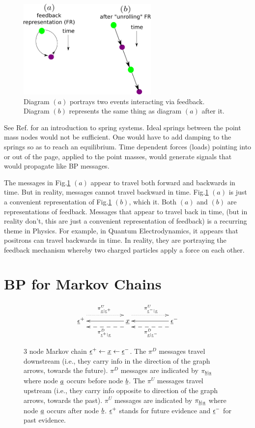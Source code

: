 \begin{figure}[h!]
\centering
\includegraphics[width=2.7in]
{mpass/time-travel.png}
\caption{Diagram $(a)$ portrays two events interacting via feedback. Diagram $(b)$
represents the same thing as diagram $(a)$
after  it.}
\label{fig-time-travel}
\end{figure}

See Ref.\cite{wiki-spring-net}
for an introduction to spring systems.
Ideal springs between the point mass
nodes would
not be sufficient.
One would have to add damping to
the springs so as
to reach an equilibrium.
Time dependent forces (loads)
pointing into or out of the page, applied
to the point masses, would
generate signals that would
propagate
like BP messages.


The messages in Fig.\ref{fig-time-travel} $(a)$ 
appear to travel both forward and backwards in time.
But in reality, messages cannot travel backward in time.  Fig.\ref{fig-time-travel} $(a)$
is just a convenient representation of 
Fig.\ref{fig-time-travel} $(b)$, which  it. Both $(a)$ and $
(b)$ are representations of feedback.
Messages that appear to travel back in time,
(but in reality don't, this are just a convenient 
representation of feedback) 
is a recurring theme in Physics. For example,
in Quantum Electrodynamics, it appears that positrons can travel backwards in time.  In reality,
they are portraying the feedback mechanism whereby two
charged
particles
apply a force on each other.



\section{BP for Markov Chains}
\begin{figure}[h!]
$$\xymatrix{
\rveps^+
\ar@{.>}@<2ex>[rr]^{\pi^U_{\rvx|\rveps^+}}
\ar@{<--}@<-2ex>[rr]_{\pi^D_{\rveps^+|\rvx}}
&&
\rvx\ar[ll]
\ar@{.>}@<2ex>[rr]^{\pi^U_{\rveps^-|\rvx}}
\ar@{<--}@<-2ex>[rr]_{\pi^D_{\rvx|\rveps^-}}
&&
\rveps^-\ar[ll]
}$$
\caption{3 node Markov chain
$\rveps^+\larrow\rvx\larrow \rveps^-$.
The $\pi^D$  messages
travel downstream (i.e.,
they carry info
in the direction
of the graph arrows, towards the future).
$\pi^D$ messages are indicated by
$\pi_{\rvb|\rva}$ where node $\rva$ occurs
before node $\rvb$.
The $\pi^U$  messages
 travel
upstream (i.e., they
carry info opposite to
direction of the graph arrows,
towards the past).
$\pi^U$ messages are indicated by
$\pi_{\rvb|\rva}$ where node $\rva$ occurs
after node $\rvb$. 
$\rveps^+$
stands for future evidence and
$\rveps^-$ for past evidence.}
\label{fig-mp-3chain}
\end{figure}

